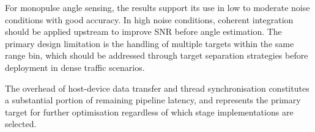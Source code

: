 For monopulse angle sensing, the results support its use in low to moderate noise 
conditions with good accuracy. In high noise conditions, coherent integration should be 
applied upstream to improve SNR before angle estimation. The primary design limitation 
is the handling of multiple targets within the same range bin, which should be addressed 
through target separation strategies before deployment in dense traffic scenarios.

The overhead of host-device data transfer and thread synchronisation constitutes a 
substantial portion of remaining pipeline latency, and represents the primary target for 
further optimisation regardless of which stage implementations are selected.